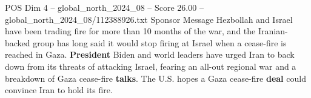 \begin{textsample}{POS Dim 4 – global\_north\_2024\_08 – Score 26.00 – global\_north\_2024\_08/112388926.txt}
Sponsor Message Hezbollah and Israel have been trading fire for more than 10 months of the war, and the Iranian-backed group has long said it would stop firing at Israel when a cease-fire is reached in Gaza. \textbf{President} Biden and world leaders have urged Iran to back down from its threats of attacking Israel, fearing an all-out regional war and a breakdown of Gaza cease-fire \textbf{talks}.
The U.S. hopes a Gaza cease-fire \textbf{deal} could convince Iran to hold its fire.

\end{textsample}
